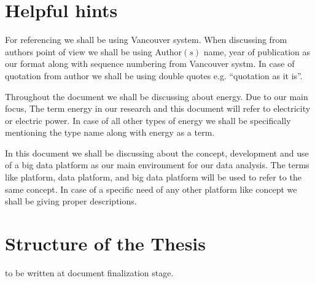 \section{Helpful hints}

For referencing we shall be using Vancouver system\cite{neville2012referencing}. When discussing from authors point of view we shall be using Author\((s)\) name, year of publication as our format along with sequence numbering from Vancouver systm. In case of quotation from author we shall be using double quotes e.g. ``quotation as it is''.

Throughout the document we shall be discussing about energy. Due to our main focus, The term energy in our research  and this document will refer to electricity or electric power. In case of all other types of energy we shall be specifically mentioning the type name along with energy as a term.

In this document we shall be discussing about the concept, development and use of a big data platform as our main environment for our data analysis. The terms like platform, data platform, and big data platform will be used to refer to the same concept. In case of a specific need of any other platform like concept we shall be giving proper descriptions.


\section{Structure of the Thesis}
\label{section:structure} 

to be written at document finalization stage. 

